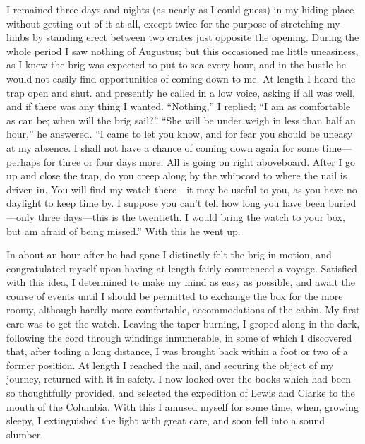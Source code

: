 I remained three days and nights (as nearly as I could guess) in my
hiding-place without getting out of it at all, except twice for the purpose of
stretching my limbs by standing erect between two crates just opposite the
opening. During the whole period I saw nothing of Augustus; but this occasioned
me little uneasiness, as I knew the brig was expected to put to sea every hour,
and in the bustle he would not easily find opportunities of coming down to me.
At length I heard the trap open and shut. and presently he called in a low
voice, asking if all was well, and if there was any thing I wanted. ``Nothing,'' I
replied; ``I am as comfortable as can be; when will the brig sail?'' ``She will be
under weigh in less than half an hour,'' he answered. ``I came to let you know,
and for fear you should be uneasy at my absence. I shall not have a chance of
coming down again for some time---perhaps for three or four days more. All is
going on right aboveboard. After I go up and close the trap, do you creep along
by the whipcord to where the nail is driven in. You will find my watch
there---it may be useful to you, as you have no daylight to keep time by. I
suppose you can't tell how long you have been buried---only three days---this is
the twentieth. I would bring the watch to your box, but am afraid of being
missed.'' With this he went up. 

In about an hour after he had gone I distinctly felt the brig in motion, and
congratulated myself upon having at length fairly commenced a voyage. Satisfied
with this idea, I determined to make my mind as easy as possible, and await the
course of events until I should be permitted to exchange the box for the more
roomy, although hardly more comfortable, accommodations of the cabin. My first
care was to get the watch. Leaving the taper burning, I groped along in the
dark, following the cord through windings innumerable, in some of which I
discovered that, after toiling a long distance, I was brought back within a foot
or two of a former position. At length I reached the nail, and securing the
object of my journey, returned with it in safety. I now looked over the books
which had been so thoughtfully provided, and selected the expedition of Lewis
and Clarke to the mouth of the Columbia. With this I amused myself for some
time, when, growing sleepy, I extinguished the light with great care, and soon
fell into a sound slumber. 

